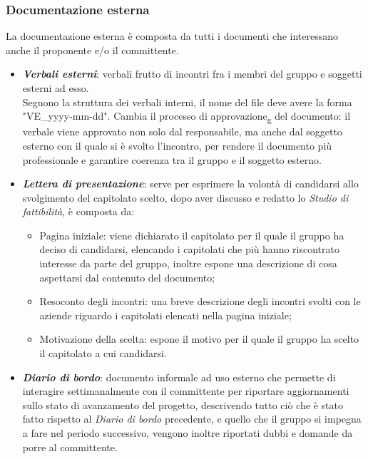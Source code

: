 \subsubsection{Documentazione esterna}
La documentazione esterna è composta da tutti i documenti che interessano anche
il proponente e/o il committente.
\begin{itemize}
      \item \textit{\textbf{Verbali esterni}}: verbali frutto di incontri fra i membri del gruppo e soggetti esterni ad esso.\\
            Seguono la struttura dei verbali interni, il nome del file deve avere la forma "VE\_yyyy-mm-dd". Cambia il processo di approvazione\textsubscript{g} del documento:
            il verbale viene approvato non solo dal responsabile, ma anche dal soggetto esterno con il quale si è svolto l'incontro,
            per rendere il documento più professionale e garantire coerenza tra il gruppo e il soggetto esterno.
      \item \textit{\textbf{Lettera di presentazione}}: serve per esprimere la volontà di candidarsi allo svolgimento del capitolato scelto, dopo aver discusso e redatto lo \textit{Studio di fattibilità},
            è composta da:
            \begin{itemize}
                  \item Pagina iniziale: viene dichiarato il capitolato per il quale il gruppo ha
                        deciso di candidarsi, elencando i capitolati che più hanno riscontrato
                        interesse da parte del gruppo, inoltre espone una descrizione di cosa
                        aspettarsi dal contenuto del documento;
                  \item Resoconto degli incontri: una breve descrizione degli incontri svolti con le
                        aziende riguardo i capitolati elencati nella pagina iniziale;
                  \item Motivazione della scelta: espone il motivo per il quale il gruppo ha scelto il
                        capitolato a cui candidarsi.
            \end{itemize}
      \item \textit{\textbf{Diario di bordo}}: documento informale ad uso esterno che permette di interagire settimanalmente con il committente per riportare aggiornamenti sullo stato di
            avanzamento del progetto, descrivendo tutto ciò che è stato fatto rispetto al \textit{Diario di bordo} precedente,
            e quello che il gruppo si impegna a fare nel periodo successivo, vengono inoltre riportati dubbi e domande da porre al committente.

\end{itemize}
